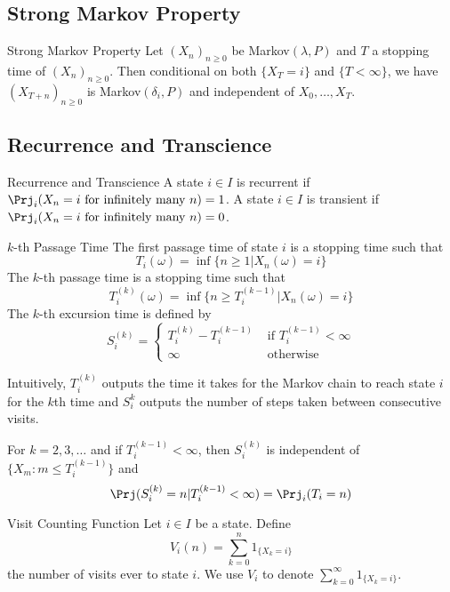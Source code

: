 \documentclass[a4paper]{article}
\begin{document}
\subsection{Strong Markov Property}
\begin{thm}{Strong Markov Property}{} Let $(X_n)_{n\geq 0}$ be Markov$(\lambda,P)$ and $T$ a stopping time of $(X_n)_{n\geq 0}$. Then conditional on both $\{X_T=i\}$ and $\{T<\infty\}$, we have $(X_{T+n})_{n\geq 0}$ is Markov$(\delta_i,P)$ and independent of $X_0,\dots,X_T$. 
\end{thm}

\subsection{Recurrence and Transcience}
\begin{defn}{Recurrence and Transcience}{} A state $i\in I$ is recurrent if $\Prj_i(X_n=i\text{ for infinitely many }n)=1$. A state $i\in I$ is transient if $\Prj_i(X_n=i\text{ for infinitely many }n)=0$. 
\end{defn}

\begin{defn}{$k$-th Passage Time}{} The first passage time of state $i$ is a stopping time such that $$T_i(\omega)=\inf\{n\geq 1|X_n(\omega)=i\}$$ The $k$-th passage time is a stopping time such that $$T_i^{(k)}(\omega)=\inf\{n\geq T_i^{(k-1)}|X_n(\omega)=i\}$$ The $k$-th excursion time is defined by $$S_i^{(k)}=\begin{cases}
T_i^{(k)}-T_i^{(k-1)} & \text{ if }T_i^{(k-1)}<\infty\\
\infty & \text{ otherwise }
\end{cases}$$
\end{defn}

Intuitively, $T_i^{(k)}$ outputs the time it takes for the Markov chain to reach state $i$ for the $k$th time and $S_i^k$ outputs the number of steps taken between consecutive visits. 

\begin{lmm}{}{} For $k=2,3,\dots$ and if $T_i^{(k-1)}<\infty$, then $S_i^{(k)}$ is independent of $\{X_m:m\leq T_i^{(k-1)}\}$ and $$\Prj(S_i^{(k)}=n|T_i^{(k-1)}<\infty)=\Prj_i(T_i=n)$$
\end{lmm}

\begin{defn}{Visit Counting Function}{} Let $i\in I$ be a state. Define $$V_i(n)=\sum_{k=0}^n1_{\{X_k=i\}}$$ the number of visits ever to state $i$. We use $V_i$ to denote $\sum_{k=0}^\infty 1_{\{X_k=i\}}$. 
\end{defn}
\end{document}
